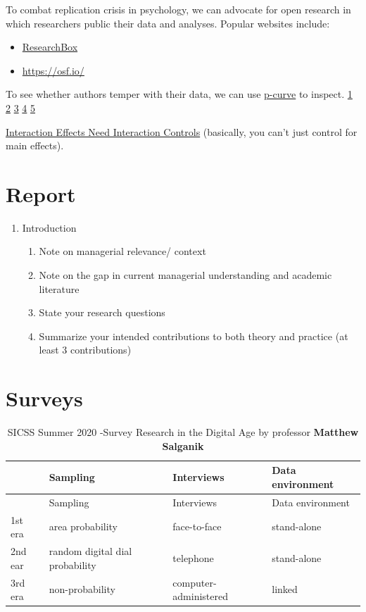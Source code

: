 \documentclass[
]{book}
\begin{document}
To combat replication crisis in psychology, we can advocate for open research in which researchers public their data and analyses. Popular websites include:

\begin{itemize}
\item
  \href{https://researchbox.org/index.php}{ResearchBox}
\item
  \url{https://osf.io/}
\end{itemize}

To see whether authors temper with their data, we can use \href{http://p-curve.com/}{p-curve} to inspect. \href{https://datacolada.org/66}{1} \href{https://datacolada.org/67}{2} \href{https://datacolada.org/49}{3} \href{https://datacolada.org/45}{4} \href{https://datacolada.org/91}{5}

\href{https://datacolada.org/80}{Interaction Effects Need Interaction Controls} (basically, you can't just control for main effects).

\hypertarget{report}{%
\chapter{Report}\label{report}}

\begin{enumerate}
\def\labelenumi{\arabic{enumi}.}
\item
  Introduction

  \begin{enumerate}
  \def\labelenumii{\arabic{enumii}.}
  \item
    Note on managerial relevance/ context
  \item
    Note on the gap in current managerial understanding and academic literature
  \item
    State your research questions
  \item
    Summarize your intended contributions to both theory and practice (at least 3 contributions)
  \end{enumerate}
\end{enumerate}

\hypertarget{surveys-1}{%
\chapter{Surveys}\label{surveys-1}}

\begin{longtable}[]{@{}llll@{}}
\caption{SICSS Summer 2020 -Survey Research in the Digital Age by professor \textbf{Matthew Salganik}}\tabularnewline
\toprule
& Sampling & Interviews & Data environment\tabularnewline
\midrule
\endfirsthead
\toprule
& Sampling & Interviews & Data environment\tabularnewline
\midrule
\endhead
1st era & area probability & face-to-face & stand-alone\tabularnewline
2nd ear & random digital dial probability & telephone & stand-alone\tabularnewline
3rd era & non-probability & computer-administered & linked\tabularnewline
\bottomrule
\end{longtable}
\end{document}
